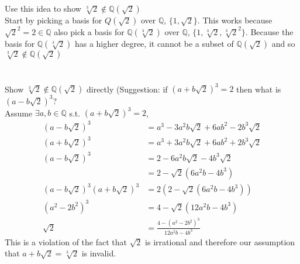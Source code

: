 \documentclass{article}
\begin{document}
    \section{}
    Use this idea to show $\sqrt[3]{2} \notin \mathbb{Q}(\sqrt{2})$\\
    Start by picking a basis for $Q(\sqrt{2})$ over $ \mathbb{Q}$, $\{1,\sqrt{2}\}$. This works
    because $\sqrt{2}^2 = 2 \in \mathbb{Q}$ also pick a basis for $ \mathbb{Q}(\sqrt[3]{2})$ over $ \mathbb{Q}$, $\{1,\sqrt[3]{2},\sqrt[3]{2}^2\}$. Because the basis for $ \mathbb{Q}(\sqrt[3]{2})$ has a higher degree,
    it cannot be a subset of $ \mathbb{Q}(\sqrt{2})$ and so $\sqrt[3]{2} \notin \mathbb{Q}(\sqrt{2})$
    \section{}
    Show $\sqrt[3]{2} \notin \mathbb{Q}(\sqrt{2})$ directly (Suggestion: if $(a+b\sqrt{2})^{3} = 2$ then what is $(a-b\sqrt{2})^{3}$?\\
    Assume $\exists a,b \in \mathbb{Q}$ s.t. $(a+b\sqrt{2})^{3} = 2$,
    \begin{align*}
        (a-b\sqrt{2})^{3} &= a^{3} - 3a^2b\sqrt{2} + 6ab^2 - 2b^3\sqrt{2}\\
        (a+b\sqrt{2})^{3} &= a^{3} + 3a^2b\sqrt{2} + 6ab^2 + 2b^{3}\sqrt{2}\\
        (a-b\sqrt{2})^{3} &= 2 -6a^2b\sqrt{2} - 4b^{3}\sqrt{2}\\
                          &= 2- \sqrt{2}(6a^2b-4b^{3})\\
        (a-b\sqrt{2})^{3}(a+b\sqrt{2})^{3} &= 2(2-\sqrt{2}(6a^2b-4b^{3}))\\
        (a^2-2b^2)^{3} &= 4-\sqrt{2}(12a^2b-4b^{3})\\
        \sqrt{2} &= \frac{4-(a^2-2b^2)^{3}}{12a^2b-4b^{3}}   
    \end{align*}
    This is a violation of the fact that $\sqrt{2}$ is irrational and therefore our assumption that $a+b\sqrt{2} = \sqrt[3]{2}$ is invalid.
\end{document}
